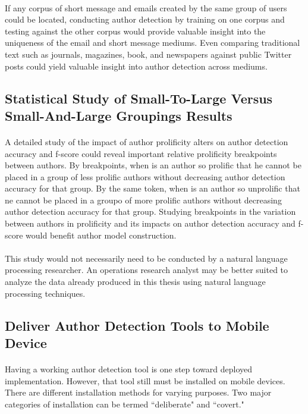 	\paragraph*{} If any corpus of short message and emails created by the same group of users could be located, conducting author detection by training on one corpus and testing against the other corpus would provide valuable insight into the uniqueness of the email and short message mediums.  Even comparing traditional text such as journals, magazines, book, and newspapers against public Twitter posts could yield valuable insight into author detection across mediums.

	\begin{singlespace}
	\subsection{Statistical Study of Small-To-Large Versus Small-And-Large Groupings Results}
	\end{singlespace}
	\paragraph*{} A detailed study of the impact of author prolificity alters on author detection accuracy and f-score could reveal important relative prolificity breakpoints between authors.  By breakpoints, when is an author so prolific that he cannot be placed in a group of less prolific authors without decreasing author detection accuracy for that group. By the same token, when is an author so unprolific that ne cannot be placed in a groupo of more prolific authors without decreasing author detection accuracy for that group. Studying breakpoints in the variation between authors in prolificity and its impacts on author detection accuracy and f-score would benefit author model construction.
	\paragraph*{} This study would not necessarily need to be conducted by a natural language processing researcher.  An operations research analyst may be better suited to analyze the data already produced in this thesis using natural language processing techniques.

		\subsection{Deliver Author Detection Tools to Mobile Device}
			\paragraph*{} Having a working author detection tool is one step toward deployed implementation. However, that tool still must be installed on mobile devices.  There are different installation methods for varying purposes.  Two major categories of installation can be termed ``deliberate" and ``covert."
